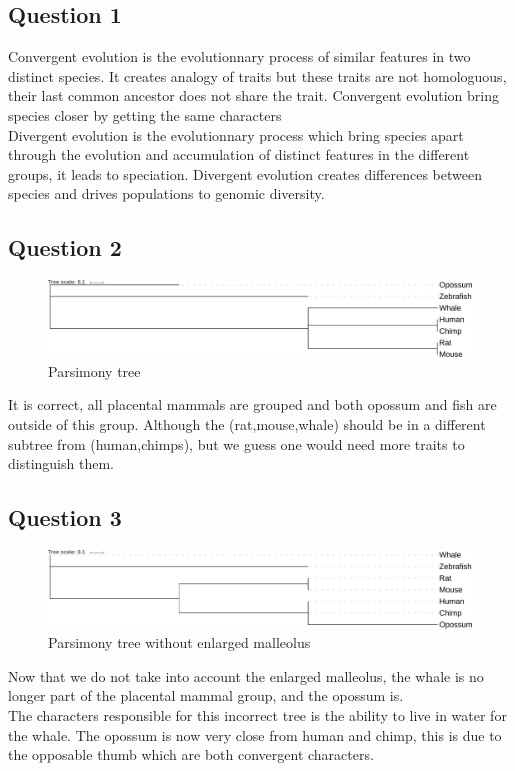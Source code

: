 \documentclass[]{article}
\theoremstyle{definition}
\begin{document}
\subsection{Question 1}

Convergent evolution is the evolutionnary process of similar features in two distinct species. It creates analogy of traits but these traits are not homologuous, their last common ancestor does not share the trait. Convergent evolution bring species closer by getting the same characters\\
Divergent evolution is the evolutionnary process which bring species apart through the evolution and accumulation of distinct features in the different groups, it leads to speciation.
Divergent evolution creates differences between species and drives populations to genomic diversity.

\subsection{Question 2}
\begin{figure}[h!]
	\includegraphics*[width = \linewidth]{../ex3/PARS.pdf}
	\caption{\label{nj2} Parsimony tree }
\end{figure}
It is correct, all placental mammals are grouped and both opossum and fish are outside of this group. Although the (rat,mouse,whale) should be in a different subtree from (human,chimps), but we guess one would need more traits to distinguish them. 
\subsection{Question 3}
\begin{figure}[h!]
	\includegraphics*[width = \linewidth]{../ex3/PARS2.pdf}
	\caption{\label{nj2} Parsimony tree without enlarged malleolus }
\end{figure}
Now that we do not take into account the enlarged malleolus, the whale is no longer part of the placental mammal group, and the opossum is.\\
The characters responsible for this incorrect tree is the ability to live in water for the whale. The opossum is now very close from human and chimp, this is due to the opposable thumb which are both convergent characters.\\
\end{document}
